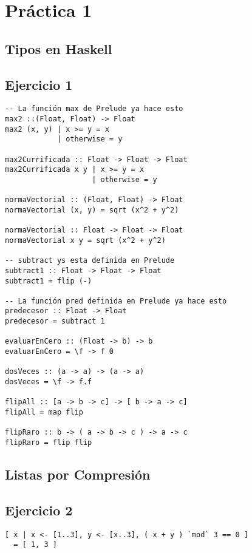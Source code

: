 \section{Práctica 1}
\subsection*{Tipos en Haskell}
\subsection{Ejercicio 1}
\begin{centrado}
\begin{verbatim}
-- La función max de Prelude ya hace esto
max2 ::(Float, Float) -> Float
max2 (x, y) | x >= y = x        
            | otherwise = y

max2Currificada :: Float -> Float -> Float
max2Currificada x y | x >= y = x
                    | otherwise = y

normaVectorial :: (Float, Float) -> Float
normaVectorial (x, y) = sqrt (x^2 + y^2)

normaVectorial :: Float -> Float -> Float
normaVectorial x y = sqrt (x^2 + y^2)

-- subtract ys esta definida en Prelude
subtract1 :: Float -> Float -> Float  
subtract1 = flip (-)

-- La función pred definida en Prelude ya hace esto
predecesor :: Float -> Float  
predecesor = subtract 1

evaluarEnCero :: (Float -> b) -> b
evaluarEnCero = \f -> f 0

dosVeces :: (a -> a) -> (a -> a)
dosVeces = \f -> f.f

flipAll :: [a -> b -> c] -> [ b -> a -> c]
flipAll = map flip

flipRaro :: b -> ( a -> b -> c ) -> a -> c
flipRaro = flip flip
\end{verbatim}
\end{centrado}

\subsection*{Listas por Compresión}
\subsection{Ejercicio 2}
\begin{centrado}
\begin{verbatim}
[ x | x <- [1..3], y <- [x..3], ( x + y ) `mod` 3 == 0 ] 
  = [ 1, 3 ]
\end{verbatim}
\end{centrado}

